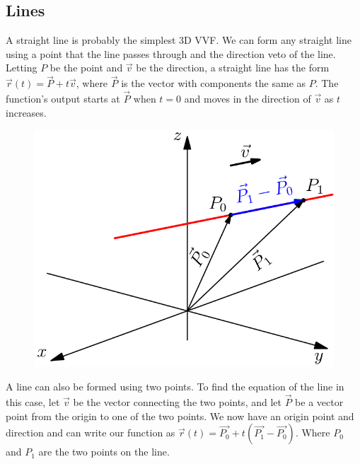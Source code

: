 \subsection{Lines}
\noindent
A straight line is probably the simplest 3D VVF. We can form any straight line using a point that the line passes through and the direction veto of the line.\\
Letting $P$ be the point and $\vec{v}$ be the direction, a straight line has the form $\vec{r}(t) = \vec{P}+t\vec{v}$, where $\vec{P}$ is the vector with components the same as $P$. The function's output starts at $\vec{P}$ when $t=0$ and moves in the direction of $\vec{v}$ as $t$ increases.

\begin{figure}[h]
	\centering
	\includegraphics[scale=0.33]{Images/vectorValuedFunctions/VectorLine}
\end{figure}

\noindent
A line can also be formed using two points. To find the equation of the line in this case, let $\vec{v}$ be the vector connecting the two points, and let $\vec{P}$ be a vector point from the origin to one of the two points. We now have an origin point and direction and can write our function as $\vec{r}(t) = \vec{P_0} + t\left(\vec{P_1} - \vec{P_0}\right)$. Where $P_0$ and $P_1$ are the two points on the line.